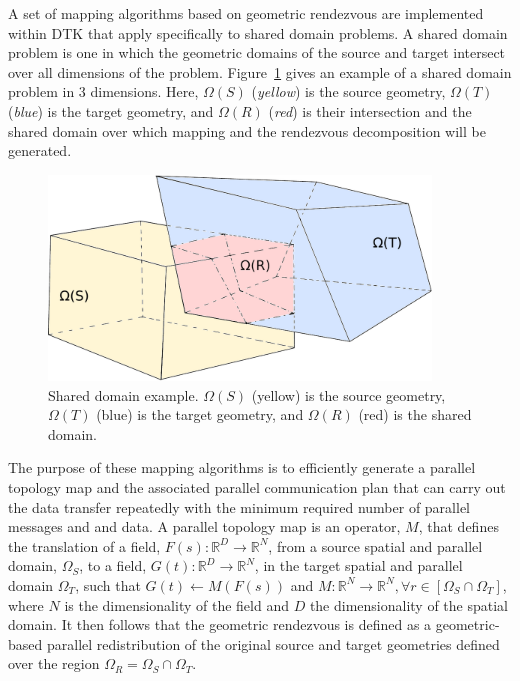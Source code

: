 \documentclass{mc2013}
\begin{document}
A set of mapping algorithms based on geometric rendezvous are
implemented within DTK that apply specifically to shared domain
problems. A shared domain problem is one in which the geometric
domains of the source and target intersect over all dimensions of the
problem. Figure~\ref{fig:shared_domain} gives an example of a shared
domain problem in 3 dimensions. Here, $\Omega(S)$ ({\sl yellow}) is
the source geometry, $\Omega(T)$ ({\sl blue}) is the target geometry,
and $\Omega(R)$ ({\sl red}) is their intersection and the shared
domain over which mapping and the rendezvous decomposition will be
generated.
\begin{figure}[htpb!]
  \centering \includegraphics[width=4in]{overlapping_domain.pdf}
  \caption{Shared domain example. $\Omega(S)$ (yellow) is the source
    geometry, $\Omega(T)$ (blue) is the target geometry, and
    $\Omega(R)$ (red) is the shared domain.}
  \label{fig:shared_domain}
\end{figure}
The purpose of these mapping algorithms is to efficiently generate a
parallel topology map and the associated parallel communication plan
that can carry out the data transfer repeatedly with the minimum
required number of parallel messages and and data. A parallel topology
map is an operator, $M$, that defines the translation of a field,
$F(s): \mathbb{R}^D \rightarrow \mathbb{R}^N$, from a source spatial
and parallel domain, $\Omega_S$, to a field, $G(t): \mathbb{R}^D
\rightarrow \mathbb{R}^N$, in the target spatial and parallel domain
$\Omega_T$, such that $G(t)\leftarrow M(F(s))$ and $M: \mathbb{R}^N
\rightarrow \mathbb{R}^N, \forall r \in [\Omega_S \cap \Omega_T]$,
where $N$ is the dimensionality of the field and $D$ the
dimensionality of the spatial domain. It then follows that the
geometric rendezvous is defined as a geometric-based parallel
redistribution of the original source and target geometries defined
over the region $\Omega_R = \Omega_S \cap \Omega_T$.
\end{document}
